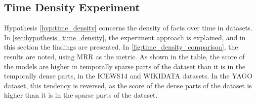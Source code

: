 \subsection{Time Density Experiment}
\label{sec:time_density_experiment}

Hypothesis \ref{hyp:time_density} concerns the density of facts over time in datasets. In \autoref{sec:hypothesis_time_density}, the experiment approach is explained, and in this section the findings are presented. In \autoref{fig:time_density_comparison}, the results are noted, using MRR as the metric. As shown in the table, the score of the models are higher in temporally sparse parts of the dataset than it is in the temporally dense parts, in the ICEWS14 and WIKIDATA datasets. In the YAGO dataset, this tendency is reversed, as the score of the dense parts of the dataset is higher than it is in the sparse parts of the dataset.


